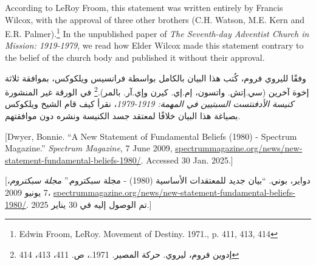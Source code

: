 According to LeRoy Froom, this statement was written entirely by Francis Wilcox, with the approval of three other brothers (C.H. Watson, M.E. Kern and E.R. Palmer).\footnote{Edwin Froom, LeRoy. Movement of Destiny. 1971., p. 411, 413, 414} In the unpublished paper of \textit{The Seventh-day Adventist Church in Mission: 1919-1979}, we read how Elder Wilcox made this statement contrary to the belief of the church body and published it without their approval.


وفقًا لليروي فروم، كُتب هذا البيان بالكامل بواسطة فرانسيس ويلكوكس، بموافقة ثلاثة إخوة آخرين (سي.إتش. واتسون، إم.إي. كيرن وإي.آر. بالمر).\footnote{إدوين فروم، ليروي. حركة المصير. 1971.، ص. 411، 413، 414} في الورقة غير المنشورة \textit{كنيسة الأدفنتست السبتيين في المهمة: 1919-1979}، نقرأ كيف قام الشيخ ويلكوكس بصياغة هذا البيان خلافًا لمعتقد جسد الكنيسة ونشره دون موافقتهم.


[Dwyer, Bonnie. “A New Statement of Fundamental Beliefs (1980) - Spectrum Magazine.” \textit{Spectrum Magazine}, 7 June 2009, \href{https://spectrummagazine.org/news/new-statement-fundamental-beliefs-1980/}{spectrummagazine.org/news/new-statement-fundamental-beliefs-1980/}. Accessed 30 Jan. 2025.]


[دواير، بوني. “بيان جديد للمعتقدات الأساسية (1980) - مجلة سبكتروم.” \textit{مجلة سبكتروم}، 7 يونيو 2009، \href{https://spectrummagazine.org/news/new-statement-fundamental-beliefs-1980/}{spectrummagazine.org/news/new-statement-fundamental-beliefs-1980/}. تم الوصول إليه في 30 يناير 2025.]


